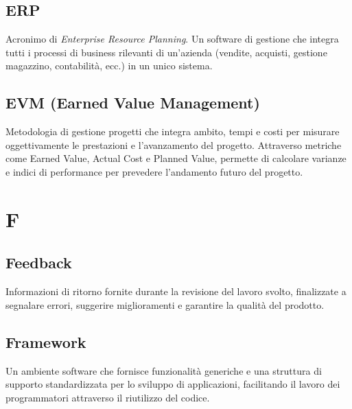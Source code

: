 \documentclass[a4paper, 11pt, oneside]{scrartcl} %
\begin{document}
\subsection*{ERP}
Acronimo di \textit{Enterprise Resource Planning}. Un software di gestione che integra tutti i processi di business rilevanti di un'azienda (vendite, acquisti, gestione magazzino, contabilità, ecc.) in un unico sistema.
\vspace{0.5cm}

\subsection*{EVM (Earned Value Management)}
Metodologia di gestione progetti che integra ambito, tempi e costi per misurare oggettivamente le prestazioni e l'avanzamento del progetto. Attraverso metriche come Earned Value, Actual Cost e Planned Value, permette di calcolare varianze e indici di performance per prevedere l'andamento futuro del progetto.
\vspace{0.5cm}


\section*{F}


\subsection*{Feedback}


Informazioni di ritorno fornite durante la revisione del lavoro svolto, finalizzate a segnalare errori, suggerire miglioramenti e garantire la qualità del prodotto.

\vspace{0.5cm}

\subsection*{Framework}
Un ambiente software che fornisce funzionalità generiche e una struttura di supporto standardizzata per lo sviluppo di applicazioni, facilitando il lavoro dei programmatori attraverso il riutilizzo del codice.
\vspace{0.5cm}
\end{document}
